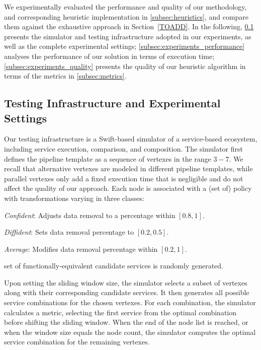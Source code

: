We experimentally evaluated the performance and quality of our methodology,
and corresponding heuristic implementation in \cref{subsec:heuristics},
and compare them against the exhaustive approach in Section~\ref{TOADD}.
In the following,
\cref{subsec:experiments_infrastructure} presents the simulator and testing infrastructure adopted in our experiments, as well as the complete experimental settings; \cref{subsec:experiments_performance} analyses the performance of our solution in terms of execution time; \cref{subsec:experiments_quality} presents the quality of our heuristic algorithm in terms of the metrics in \cref{subsec:metrics}.

\subsection{Testing Infrastructure and Experimental Settings}\label{subsec:experiments_infrastructure}
Our testing infrastructure is a Swift-based simulator of a service-based ecosystem, including service execution, comparison, and composition.
The simulator first defines the pipeline template as a sequence of vertexes in the range $3-7$.
We recall that alternative vertexes are modeled in different pipeline templates,
while parallel vertexes only add a fixed execution time that is negligible and do not affect the quality of our approach.
Each node is associated with a (set of) policy with transformations varying in three classes:

\begin{itemize*}[label=roman*]
  \item \textit{Confident}: Adjusts data removal to a percentage within $[0.8,1]$.
  \item \textit{Diffident}: Sets data removal percentage to $[0.2,0.5]$.
  \item \textit{Average}: Modifies data removal percentage within $[0.2,1]$.
\end{itemize*}
set of functionally-equivalent candidate services is randomly generated.

Upon setting the sliding window size, the simulator selects a subset of vertexes along with their corresponding candidate services.
It then generates all possible service combinations for the chosen vertexes.
For each combination, the simulator calculates a metric, selecting the first service from the optimal combination before shifting the sliding window.
When the end of the node list is reached, or when the window size equals the node count, the simulator computes the optimal service combination for the remaining vertexes.

